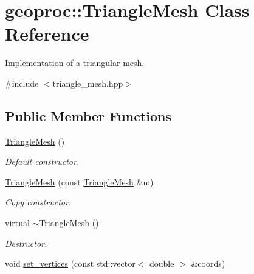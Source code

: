\hypertarget{classgeoproc_1_1TriangleMesh}{}\section{geoproc\+:\+:Triangle\+Mesh Class Reference}
\label{classgeoproc_1_1TriangleMesh}


Implementation of a triangular mesh.  




{\ttfamily \#include $<$triangle\+\_\+mesh.\+hpp$>$}

\subsection*{Public Member Functions}
\begin{DoxyCompactItemize}
\item 
\mbox{\label{classgeoproc_1_1TriangleMesh_a73c49980eb81e2df75242515b5ef1ed7}} 
\hyperlink{classgeoproc_1_1TriangleMesh_a73c49980eb81e2df75242515b5ef1ed7}{Triangle\+Mesh} ()
\begin{DoxyCompactList}\small\item\em Default constructor. \end{DoxyCompactList}\item 
\mbox{\label{classgeoproc_1_1TriangleMesh_ae660da7765a405ac44640d2ad46a6903}} 
\hyperlink{classgeoproc_1_1TriangleMesh_ae660da7765a405ac44640d2ad46a6903}{Triangle\+Mesh} (const \hyperlink{classgeoproc_1_1TriangleMesh}{Triangle\+Mesh} \&m)
\begin{DoxyCompactList}\small\item\em Copy constructor. \end{DoxyCompactList}\item 
\mbox{\label{classgeoproc_1_1TriangleMesh_a587721dac1419702470fbca953fb7f1c}} 
virtual \hyperlink{classgeoproc_1_1TriangleMesh_a587721dac1419702470fbca953fb7f1c}{$\sim$\+Triangle\+Mesh} ()
\begin{DoxyCompactList}\small\item\em Destructor. \end{DoxyCompactList}\item 
void \hyperlink{classgeoproc_1_1TriangleMesh_acdee6975fe8d504956211a154adbf77c}{set\+\_\+vertices} (const std\+::vector$<$ double $>$ \&coords)

\end{DoxyCompactItemize}
